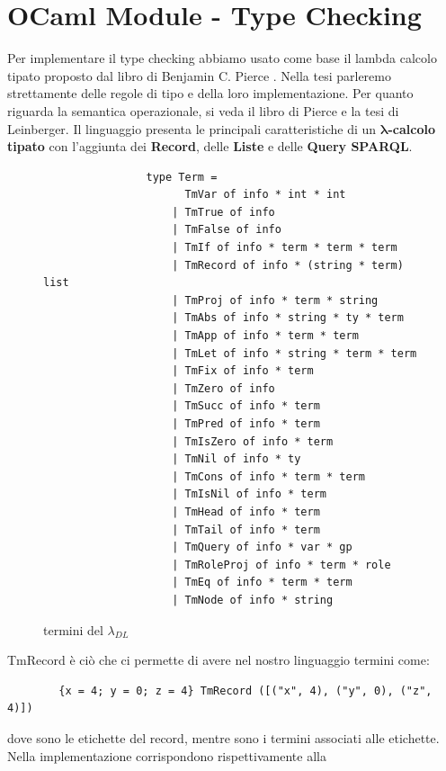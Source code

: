 \section{OCaml Module - Type Checking}\label{sec:Type Checking}
        Per implementare il type checking abbiamo usato come base il lambda calcolo tipato proposto dal libro di Benjamin C. Pierce \cite{TypesAndProgrammingLanguages}.
        Nella tesi parleremo strettamente delle regole di tipo e della loro implementazione. Per quanto riguarda la semantica operazionale, si veda il libro di Pierce e la tesi di Leinberger\cite{leinbergerphdthesis}.
        Il linguaggio presenta le principali caratteristiche di un \textbf{ $\boldsymbol{\lambda}$-calcolo tipato} con l'aggiunta dei \textbf{Record}, delle \textbf{Liste} e delle \textbf{Query SPARQL}.
        \begin{figure}[h] 
            \begin{verbatim}
                type Term =
                      TmVar of info * int * int 
                    | TmTrue of info 
                    | TmFalse of info 
                    | TmIf of info * term * term * term 
                    | TmRecord of info * (string * term) list 
                    | TmProj of info * term * string 
                    | TmAbs of info * string * ty * term 
                    | TmApp of info * term * term 
                    | TmLet of info * string * term * term 
                    | TmFix of info * term 
                    | TmZero of info 
                    | TmSucc of info * term 
                    | TmPred of info * term 
                    | TmIsZero of info * term 
                    | TmNil of info * ty 
                    | TmCons of info * term * term 
                    | TmIsNil of info * term 
                    | TmHead of info * term 
                    | TmTail of info * term  
                    | TmQuery of info * var * gp
                    | TmRoleProj of info * term * role
                    | TmEq of info * term * term
                    | TmNode of info * string
            \end{verbatim}
        \caption{termini del $\lambda_{DL}$}
        \end{figure}
        TmRecord è ciò che ci permette di avere nel nostro linguaggio termini come:
        \begin{verbatim}
        {x = 4; y = 0; z = 4} TmRecord ([("x", 4), ("y", 0), ("z", 4)])
        \end{verbatim}
        dove  sono le etichette del record, mentre  sono i termini associati alle etichette. Nella implementazione corrispondono rispettivamente alla
